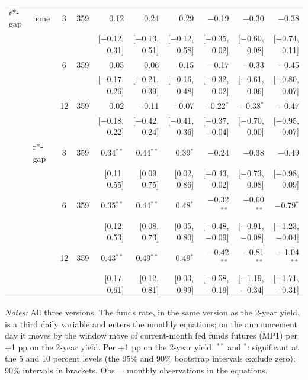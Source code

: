 \begin{longtable}{llcrrrrrrr}
\addlinespace
r*-gap & none & 3 & 359 & 0.12 & 0.24 & 0.29 & $-$0.19 & $-$0.30 & $-$0.38\\
 & & & & {\scriptsize [$-$0.12, 0.31]} & {\scriptsize [$-$0.13, 0.51]} & {\scriptsize [$-$0.12, 0.58]} & {\scriptsize [$-$0.35, 0.02]} & {\scriptsize [$-$0.60, 0.08]} & {\scriptsize [$-$0.74, 0.11]}\\
 &  & 6 & 359 & 0.05 & 0.06 & 0.15 & $-$0.17 & $-$0.33 & $-$0.45\\
 & & & & {\scriptsize [$-$0.17, 0.26]} & {\scriptsize [$-$0.21, 0.39]} & {\scriptsize [$-$0.16, 0.48]} & {\scriptsize [$-$0.32, 0.02]} & {\scriptsize [$-$0.61, 0.06]} & {\scriptsize [$-$0.80, 0.07]}\\
 &  & 12 & 359 & 0.02 & $-$0.11 & $-$0.07 & $-$0.22$^{*}$ & $-$0.38$^{*}$ & $-$0.47\\
 & & & & {\scriptsize [$-$0.18, 0.22]} & {\scriptsize [$-$0.42, 0.24]} & {\scriptsize [$-$0.41, 0.36]} & {\scriptsize [$-$0.37, $-$0.04]} & {\scriptsize [$-$0.70, 0.00]} & {\scriptsize [$-$0.95, 0.07]}\\
 & r*-gap & 3 & 359 & 0.34$^{**}$ & 0.44$^{**}$ & 0.39$^{*}$ & $-$0.24 & $-$0.38 & $-$0.49\\
 & & & & {\scriptsize [0.11, 0.55]} & {\scriptsize [0.09, 0.75]} & {\scriptsize [0.02, 0.86]} & {\scriptsize [$-$0.43, 0.02]} & {\scriptsize [$-$0.73, 0.08]} & {\scriptsize [$-$0.98, 0.09]}\\
 &  & 6 & 359 & 0.35$^{**}$ & 0.44$^{**}$ & 0.48$^{*}$ & $-$0.32$^{**}$ & $-$0.60$^{**}$ & $-$0.79$^{*}$\\
 & & & & {\scriptsize [0.12, 0.53]} & {\scriptsize [0.08, 0.73]} & {\scriptsize [0.05, 0.80]} & {\scriptsize [$-$0.48, $-$0.09]} & {\scriptsize [$-$0.91, $-$0.08]} & {\scriptsize [$-$1.23, $-$0.04]}\\
 &  & 12 & 359 & 0.43$^{**}$ & 0.49$^{**}$ & 0.49$^{*}$ & $-$0.42$^{**}$ & $-$0.81$^{**}$ & $-$1.04$^{**}$\\
 & & & & {\scriptsize [0.17, 0.61]} & {\scriptsize [0.12, 0.81]} & {\scriptsize [0.03, 0.99]} & {\scriptsize [$-$0.58, $-$0.19]} & {\scriptsize [$-$1.19, $-$0.34]} & {\scriptsize [$-$1.71, $-$0.31]}\\
\end{longtable}
\begin{flushleft}\footnotesize\textit{Notes:} All three versions. The funds rate, in the same version as the 2-year yield, is a third daily variable and enters the monthly equations; on the announcement day it moves by the window move of current-month fed funds futures (MP1) per +1 pp on the 2-year yield. Per +1 pp on the 2-year yield. $^{**}$ and $^{*}$: significant at the 5 and 10 percent levels (the 95\% and 90\% bootstrap intervals exclude zero); 90\% intervals in brackets. Obs = monthly observations in the equations.\end{flushleft}
\endgroup
